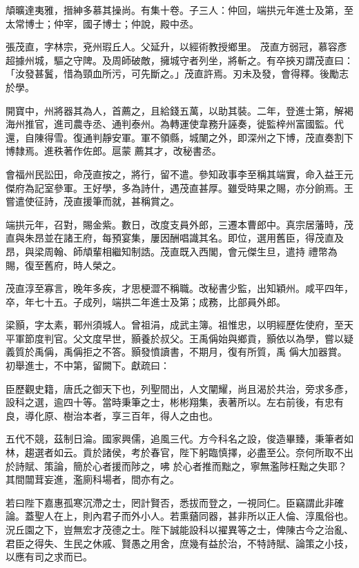 \begin{pinyinscope}
 頏曠達夷雅，搢紳多慕其操尚。有集十卷。子三人：仲回，端拱元年進士及第，至太常博士；仲宰，國子博士；仲說，殿中丞。



 張茂直，字林宗，兗州瑕丘人。父延升，以經術教授鄉里。
 茂直方弱冠，慕容彥超據州城，驅之守陴。及周師破敵，擁城守者列坐，將斬之。有卒挾刃謂茂直曰：「汝發甚鬒，惜為頸血所污，可先斷之。」茂直許焉。刃未及發，會得釋。後勵志於學。



 開寶中，州將器其為人，首薦之，且給錢五萬，以助其裝。二年，登進士第，解褐海州推官，進司農寺丞、通判泰州。為轉運使韋務升誣奏，徙監梓州富國監。代還，自陳得雪。復通判靜安軍。軍不領縣，城闉之外，即深州之下博，茂直奏割下博隸焉。進秩著作佐郎。扈蒙
 薦其才，改秘書丞。



 會福州民訟田，命茂直按之，將行，留不遣。參知政事李至稱其端實，命入益王元傑府為記室參軍。王好學，多為詩什，遇茂直甚厚。雖受時果之賜，亦分餉焉。王嘗遣使征詩，茂直援筆而就，甚稱賞之。



 端拱元年，召對，賜金紫。數日，改度支員外郎，三遷本曹郎中。真宗居藩時，茂直與朱昂並在諸王府，每預宴集，屢因酬唱識其名。即位，選用舊臣，得茂直及昂，與梁周翰、師頏輩相繼知制誥。茂直既入西閣，會元傑生旦，遣持
 禮幣為賜，復至舊府，時人榮之。



 茂直淳至寡言，晚年多疾，才思梗澀不稱職。改秘書少監，出知穎州。咸平四年，卒，年七十五。子成列，端拱二年進士及第；成務，比部員外郎。



 梁顥，字太素，鄆州須城人。曾祖涓，成武主簿。祖惟忠，以明經歷佐使府，至天平軍節度判官。父文度早世，顥養於叔父。王禹偁始與鄉貢，顥依以為學，嘗以疑義質於禹偁，禹偁拒之不答。顥發憤讀書，不期月，復有所質，禹
 偁大加器賞。初舉進士，不中第，留闕下。獻疏曰：



 臣歷觀史籍，唐氏之御天下也，列聖間出，人文闡耀，尚且渴於共治，旁求多彥，設科之選，逾四十等。當時秉筆之士，彬彬翔集，表著所以。左右前後，有忠有良，導化原、樹治本者，享三百年，得人之由也。



 五代不競，茲制日淪。國家興儒，追風三代。方今科名之設，俊造畢臻，秉筆者如林，趨選者如云。貢於諸侯，考於春官，陛下躬臨慎擇，必盡至公。奈何所取不出於詩賦、策論，簡於心者援而陟之，咈
 於心者推而黜之，寧無濫陟枉黜之失耶？其間闒茸妄進，濫廁科場者，間亦有之。



 若曰陛下嘉惠孤寒沉滯之士，罔計賢否，悉拔而登之，一視同仁。臣竊謂此非確論。蓋聖人在上，則內君子而外小人。若熏蕕同器，甚非所以正人倫、淳風俗也。況丘園之下，豈無宏才茂德之士。陛下誠能設科以擢異等之士，俾陳古今之治亂、君臣之得失、生民之休戚、賢愚之用舍，庶幾有益於治，不特詩賦、論策之小技，以應有司之求而已。




\end{pinyinscope}
